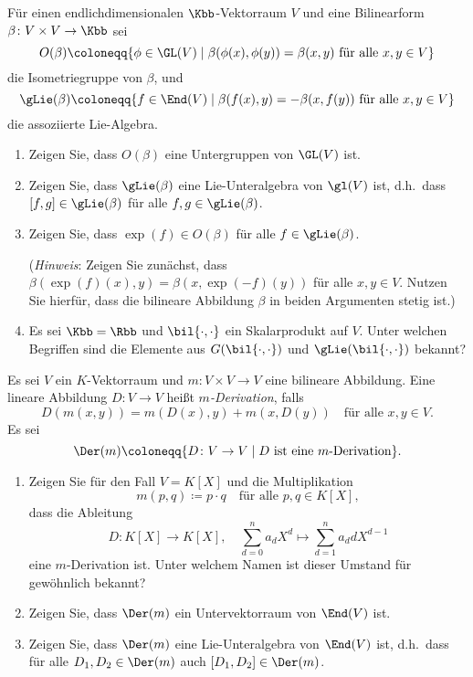 \begin{question}
  Für einen endlichdimensionalen $\Kbb$-Vektorraum $V$ und eine Bilinearform $\beta \colon V \times V \to \Kbb$ sei
  \[
              O(\beta)
    \coloneqq \{ \phi \in \GL(V) \mid \text{$\beta(\phi(x), \phi(y)) = \beta(x,y)$ für alle $x,y \in V$} \}
  \]
  die Isometriegruppe von $\beta$, und
  \[
              \gLie(\beta)
    \coloneqq \{ f \in \End(V) \mid \text{$\beta(f(x),y) = -\beta(x, f(y))$ für alle $x, y \in V$} \}
  \]
  die assoziierte Lie-Algebra.
  \begin{enumerate}[leftmargin=*]
    \item
      Zeigen Sie, dass $O(\beta)$ eine Untergruppen von $\GL(V)$ ist.
    \item
      Zeigen Sie, dass $\gLie(\beta)$ eine Lie-Unteralgebra von $\gl(V)$ ist, d.h.\ dass $[f,g] \in \gLie(\beta)$ für alle $f, g \in \gLie(\beta)$.
    \item
      Zeigen Sie, dass $\exp(f) \in O(\beta)$ für alle $f \in \gLie(\beta)$.
      
      (\emph{Hinweis}:
       Zeigen Sie zunächst, dass $\beta(\exp(f)(x) ,y) = \beta(x, \exp(-f)(y))$ für alle $x, y \in V$.
       Nutzen Sie hierfür, dass die bilineare Abbildung $\beta$ in beiden Argumenten stetig ist.)
    \item
      Es sei $\Kbb = \Rbb$ und $\bil{\cdot, \cdot}$ ein Skalarprodukt auf $V$.
      Unter welchen Begriffen sind die Elemente aus $G(\bil{\cdot, \cdot})$ und $\gLie(\bil{\cdot, \cdot})$ bekannt?
  \end{enumerate}
\end{question}


\begin{question}
  Es sei $V$ ein $K$-Vektorraum und $m \colon V \times V \to V$ eine bilineare Abbildung.
  Eine lineare Abbildung $D \colon V \to V$ heißt \emph{$m$-Derivation}, falls
  \[
    D(m(x,y))
    = m(D(x), y) + m(x, D(y))
    \quad
    \text{für alle $x, y \in V$}.
  \]
  Es sei
  \[
              \Der(m)
    \coloneqq \{ D \colon V \to V \mid \text{$D$ ist eine $m$-Derivation} \}.
  \]
  \begin{enumerate}[leftmargin=*]
    \item
      Zeigen Sie für den Fall $V = K[X]$ und die Multiplikation
      \[
        m(p,q) \coloneqq p \cdot q
        \quad
        \text{für alle $p, q \in K[X]$},
      \]
      dass die Ableitung
      \[
        D \colon K[X] \to K[X],
        \quad
        \sum_{d=0}^n a_d X^d  \mapsto \sum_{d=1}^n a_d d X^{d-1} 
      \]
      eine $m$-Derivation ist.
      Unter welchem Namen ist dieser Umstand für gewöhnlich bekannt?
    \item
      Zeigen Sie, dass $\Der(m)$ ein Untervektorraum von $\End(V)$ ist.
    \item
      Zeigen Sie, dass $\Der(m)$ eine Lie-Unteralgebra von $\End(V)$ ist, d.h.\ dass für alle $D_1, D_2 \in \Der(m)$ auch $[D_1, D_2] \in \Der(m)$.
  \end{enumerate}
\end{question}










